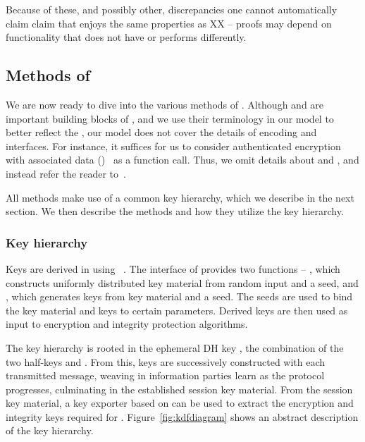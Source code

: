 Because of these, and possibly other, discrepancies one cannot automatically
claim claim that \mEdhoc{} enjoys
the same properties as XX -- proofs may depend on functionality that \mEdhoc{}
does not have or performs differently.
%

\subsection{Methods of \mEdhoc{}}
\label{sec:methods}
We are now ready to dive into the various methods of \mEdhoc. Although \mCose{} and \mCbor{} are important building blocks of \mEdhoc{}, and we use their terminology in our \mTamarin{} model to better reflect the \mSpec{}, our model does not cover the details of encoding and \mCose{} interfaces.
%
For instance, it suffices for us to consider authenticated encryption with associated data (\mAead{})~\cite{aead} as a function call. Thus, we omit details about \mCose{} and \mCbor{}, and instead refer the reader to~\cite{}. 
%

All methods make use of a common key hierarchy, which we describe in the next section. We then describe the methods and how they utilize the key hierarchy.
%

\subsubsection{Key hierarchy}
\label{sec:keyHierarchy}
Keys are derived in \mEdhoc{} using \mHkdf{}~\cite{rfc5869}.
%
The interface of \mHkdf{} provides two functions -- \mHkdfExtract{}, which constructs uniformly distributed key material from random input and a seed, and \mHkdfExpand{}, which generates keys from key material and a seed.
%
The seeds are used to bind the key material and keys to certain parameters. Derived keys are then used as input to encryption and integrity protection algorithms.
%
%

The key hierarchy is rooted in the ephemeral DH key \mGxy{}, the combination of the two half-keys \mGx{} and \mGy{}.
%
From this, keys are successively constructed with each transmitted message, weaving in information parties learn as the protocol progresses, culminating in the established session key material.
%
From the session key material, a key exporter based on \mHkdf{} can be used to extract the encryption and integrity keys required for \mOscore{}.
%
Figure~\ref{fig:kdfdiagram} shows an abstract description of the key hierarchy.
%

